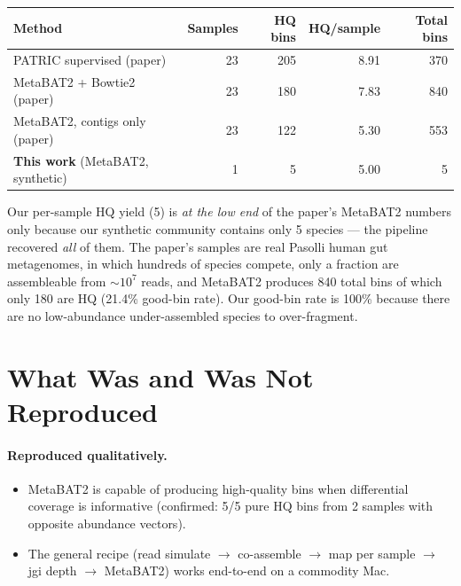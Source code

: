 \documentclass[11pt]{article}
\begin{document}
\begin{tabular}{lrrrr}
\toprule
Method & Samples & HQ bins & HQ/sample & Total bins \\
\midrule
PATRIC supervised (paper)    & 23 & 205 & 8.91 & 370 \\
MetaBAT2 + Bowtie2 (paper)   & 23 & 180 & 7.83 & 840 \\
MetaBAT2, contigs only (paper) & 23 & 122 & 5.30 & 553 \\
\midrule
\textbf{This work} (MetaBAT2, synthetic) & 1 & 5 & 5.00 & 5 \\
\bottomrule
\end{tabular}

Our per-sample HQ yield (5) is \emph{at the low end} of the paper's MetaBAT2
numbers only because our synthetic community contains only 5 species --- the
pipeline recovered \emph{all} of them. The paper's samples are real Pasolli
human gut metagenomes, in which hundreds of species compete, only a fraction
are assembleable from $\sim 10^7$ reads, and MetaBAT2 produces 840 total bins
of which only 180 are HQ (21.4\% good-bin rate). Our good-bin rate is 100\%
because there are no low-abundance under-assembled species to over-fragment.

\section{What Was and Was Not Reproduced}

\paragraph{Reproduced qualitatively.}
\begin{itemize}
  \item MetaBAT2 is capable of producing high-quality bins when differential
  coverage is informative (confirmed: 5/5 pure HQ bins from 2 samples with
  opposite abundance vectors).
  \item The general recipe (read simulate $\to$ co-assemble $\to$ map per
  sample $\to$ jgi depth $\to$ MetaBAT2) works end-to-end on a commodity Mac.
\end{itemize}
\end{document}
